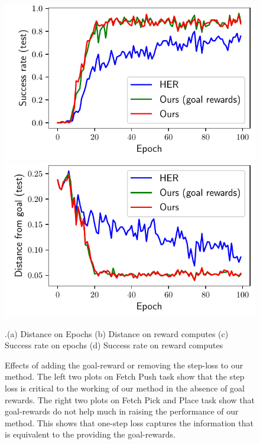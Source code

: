 \begin{figure}
\begin{minipage}[b]{0.5\linewidth}
    \includegraphics[width=\frac\columnwidth]{media/res/ablate-ours-with-goal-reward/FetchPickAndPlace-dqstepoch-test/success_rate.pdf}%
    \includegraphics[width=\frac\columnwidth]{media/res/ablate-ours-with-goal-reward/FetchPickAndPlace-dqstepoch-test/ag_g_dist.pdf}%
  \end{minipage}
  {.\tiny\color{blue}\hspace{0.8cm}(a) Distance on Epochs \hspace{1.05cm}(b) Distance on
    reward computes
    \hspace{0.70cm} (c) Success rate on epochs \hspace{0.9cm} (d) Success rate on reward computes}
  \caption{
    Effects of adding the goal-reward or removing the step-loss to our method.
    The left two plots on Fetch Push task show that the step loss is critical to the working of our
    method in the absence of goal rewards.
    The right two plots on Fetch Pick and Place task show that goal-rewards do not help much in raising the
    performance of our method. This shows that one-step loss captures the
    information that is equivalent to the providing the goal-rewards.}
  \label{fig:with-and-without-step-loss}%
\end{figure}%
% 

